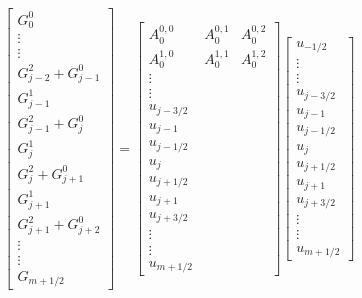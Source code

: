 \documentclass[pdf]{article}
\begin{document}
 
\begin{equation}
\begin{bmatrix}
G^0_0 \\ \vdots \\ \vdots \\G^2_{j-2} +  G^0_{j-1}  \\ G^1_{j-1}\\ G^2_{j-1} + G^0_{j} \\ G^1_{j}\\ G^2_{j} +G^0_{j+1}\\ G^1_{j + 1} \\G^2_{j + 1} +G^0_{j+2} \\ \vdots \\ \vdots \\ G_{m + 1/2}
\end{bmatrix}
 = \begin{bmatrix}
  A^{0,0}_{0} &  A^{0,1}_{0} & A^{0,2}_{0} \\ A^{1,0}_{0} &  A^{1,1}_{0} & A^{1,2}_{0} \\ \vdots \\ \vdots \\u_{j-3/2}   \\ u_{j-1} \\ u_{j-1/2}  \\ u_{j} \\ u_{j+1/2} \\ u_{j+1} \\ u_{j+3/2} \\ \vdots \\ \vdots \\ u_{m + 1/2}
 \end{bmatrix}
 \begin{bmatrix}
 u_{-1/2} \\ \vdots \\ \vdots \\u_{j-3/2}   \\ u_{j-1} \\ u_{j-1/2}  \\ u_{j} \\ u_{j+1/2} \\ u_{j+1} \\ u_{j+3/2} \\ \vdots \\ \vdots \\ u_{m + 1/2}
 \end{bmatrix}
\end{equation}
\end{document}
